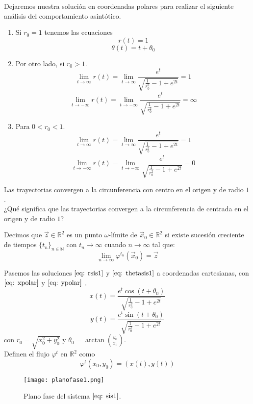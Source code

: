 Dejaremos nuestra solución en coordenadas polares para realizar el siguiente
análisis del comportamiento asintótico.\\
\begin{enumerate}
	\item Si $r_0=1$ tenemos las ecuaciones
	      $$r(t)=1$$
	      $$\theta(t)=t+\theta_0$$
	\item Por otro lado, si $r_0>1$.
	      $$\lim_{t\to\infty}r(t)=\lim_{t\to\infty}\frac{e^t}{\sqrt{\frac{1}{r_0^2}-1+e^{2t}}}=1$$
	      $$\lim_{t\to-\infty}r(t)=\lim_{t\to-\infty}\frac{e^t}{\sqrt{\frac{1}{r_0^2}-1+e^{2t}}}=\infty$$
	\item Para $0<r_0<1$.
	      $$\lim_{t\to\infty}r(t)=\lim_{t\to\infty}\frac{e^t}{\sqrt{\frac{1}{r_0^2}-1+e^{2t}}}=1$$
	      $$\lim_{t\to-\infty}r(t)=\lim_{t\to-\infty}\frac{e^t}{\sqrt{\frac{1}{r_0^2}-1+e^{2t}}}=0$$
\end{enumerate}
Las trayectorias convergen a la circunferencia con centro en el origen
y de radio  $1$.\\

¿Qué significa que las trayectorias convergen a la circunferencia de centrada en el origen y de radio $1$?

\begin{definition} 
	Decimos que $\vec{z}\in\mathbb{R}^2$ es un punto $\omega$-límite
	de $\vec{x}_0\in\mathbb{R}^2$ si existe sucesión creciente de
	tiempos $\{t_n\}_{n\in\mathbb{N}}$
	con $t_n \to\infty$ cuando $n\to \infty$ tal que:
	$$\lim_{n\to\infty}\varphi^{t_n}(\vec{x}_0)=\vec{z}$$
\end{definition}

Pasemos las soluciones $\eqref{eq: rsis1}$ y $\eqref{eq: thetasis1}$ a coordenadas cartesianas, con $\eqref{eq: xpolar}$ y $\eqref{eq: ypolar}$ \cite{guckenheimer1983nonlinear}.
\begin{equation}\label{eq: xsis1}
	x(t)=\frac{e^t\cos(t+\theta_0)}{\sqrt{\frac{1}{r_0^2}-1+e^{2t}}}
\end{equation}
\begin{equation}\label{eq: ysis1}
	y(t)=\frac{e^t\sin(t+\theta_0)}{\sqrt{\frac{1}{r_0^2}-1+e^{2t}}}
\end{equation}
con $r_0=\sqrt{x_0^2+y_0^2}$ y $\theta_0=\arctan(\frac{y_0}{x_0})$.\\
Definen el flujo $\varphi^t$ en $\mathbb{R}^2$ como
$$\varphi^t(x_0,y_0)=(x(t),y(t))$$

\begin{figure}[h]
	\centering
	\texttt{[image: planofase1.png]}
	\caption{Plano fase del sistema $\eqref{eq: sis1}$.}
\end{figure}

